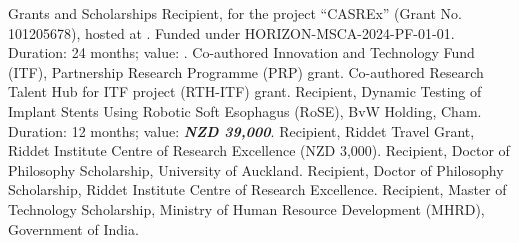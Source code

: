 \begin{rubric}{Grants and Scholarships}
        \entry*[2025] Recipient,  for the project ``CASREx'' (Grant No. 101205678), hosted at . Funded under HORIZON-MSCA-2024-PF-01-01. Duration: 24 months; value: .
        \entry*[2023] Co-authored Innovation and Technology Fund (ITF), Partnership Research Programme (PRP) grant.
        \entry*[2022] Co-authored Research Talent Hub for ITF project (RTH-ITF) grant.
        \entry*[2018] Recipient, Dynamic Testing of Implant Stents Using Robotic Soft Esophagus (RoSE), BvW Holding, Cham. Duration: 12 months; value: \textbf{\textit{NZD 39,000}}.
        \entry*[2018, 2019] Recipient, Riddet Travel Grant, Riddet Institute Centre of Research Excellence (NZD 3,000).
        \entry*[2019--2020] Recipient, Doctor of Philosophy Scholarship, University of Auckland.
        \entry*[2016--2019] Recipient, Doctor of Philosophy Scholarship, Riddet Institute Centre of Research Excellence.
        \entry*[2011--2013] Recipient, Master of Technology Scholarship, Ministry of Human Resource Development (MHRD), Government of India.
\end{rubric}